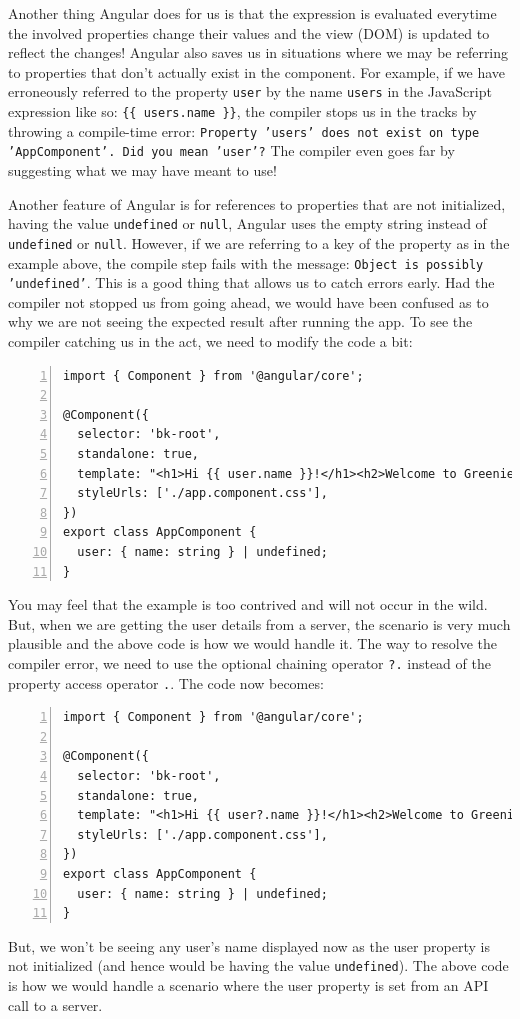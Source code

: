\documentclass{report}
\begin{document}
Another thing Angular does for us is that the expression is evaluated everytime the involved properties change their values and the view (DOM) is updated to reflect the changes! Angular also saves us in situations where we may be referring to properties that don't actually exist in the component. For example, if we have erroneously referred to the property \verb|user| by the name \verb|users| in the JavaScript expression like so: \verb|{{ users.name }}|, the compiler stops us in the tracks by throwing a compile-time error: \texttt{Property 'users' does not exist on type 'AppComponent'. Did you mean 'user'?} The compiler even goes far by suggesting what we may have meant to use!

Another feature of Angular is for references to properties that are not initialized, having the value \verb|undefined| or \verb|null|, Angular uses the empty string instead of \verb|undefined| or \verb|null|. However, if we are referring to a key of the property as in the example above, the compile step fails with the message: \texttt{Object is possibly 'undefined'}. This is a good thing that allows us to catch errors early. Had the compiler not stopped us from going ahead, we would have been confused as to why we are not seeing the expected result after running the app. To see the compiler catching us in the act, we need to modify the code a bit:

\begin{Verbatim}[numbers=left]
import { Component } from '@angular/core';

@Component({
  selector: 'bk-root',
  standalone: true,
  template: "<h1>Hi {{ user.name }}!</h1><h2>Welcome to Greenie's Book Library</h2>",
  styleUrls: ['./app.component.css'],
})
export class AppComponent {
  user: { name: string } | undefined;
}
\end{Verbatim}

You may feel that the example is too contrived and will not occur in the wild. But, when we are getting the user details from a server, the scenario is very much plausible and the above code is how we would handle it. The way to resolve the compiler error, we need to use the optional chaining operator \verb|?.| instead of the property access operator \verb|.|. The code now becomes:

\begin{Verbatim}[numbers=left]
import { Component } from '@angular/core';

@Component({
  selector: 'bk-root',
  standalone: true,
  template: "<h1>Hi {{ user?.name }}!</h1><h2>Welcome to Greenie's Book Library</h2>",
  styleUrls: ['./app.component.css'],
})
export class AppComponent {
  user: { name: string } | undefined;
}
\end{Verbatim}

But, we won't be seeing any user's name displayed now as the user property is not initialized (and hence would be having the value \verb|undefined|). The above code is how we would handle a scenario where the user property is set from an API call to a server.
\end{document}
